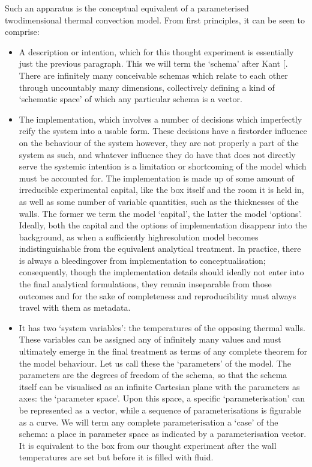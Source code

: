 \documentclass[letterpaper,10pt,english]{jupyterBook}
\begin{document}
\sphinxAtStartPar
Such an apparatus is the conceptual equivalent of a parameterised two\sphinxhyphen{}dimensional thermal convection model. From first principles, it can be seen to comprise:
\begin{itemize}
\item {} 
\sphinxAtStartPar
A description or intention, which for this thought experiment is essentially just the previous paragraph. This we will term the ‘schema’ after Kant {[}\sphinxcite{references:id64}{]}. There are infinitely many conceivable schemas which relate to each other through uncountably many dimensions, collectively defining a kind of ‘schematic space’ of which any particular schema is a vector.

\item {} 
\sphinxAtStartPar
The implementation, which involves a number of decisions which imperfectly reify the system into a usable form. These decisions have a first\sphinxhyphen{}order influence on the behaviour of the system \sphinxhyphen{} however, they are not properly a part of the system as such, and whatever influence they do have that does not directly serve the systemic intention is a limitation or shortcoming of the model which must be accounted for. The implementation is made up of some amount of irreducible experimental capital, like the box itself and the room it is held in, as well as some number of variable quantities, such as the thicknesses of the walls. The former we term the model ‘capital’, the latter the model ‘options’. Ideally, both the capital and the options of implementation disappear into the background, as when a sufficiently high\sphinxhyphen{}resolution model becomes indistinguishable from the equivalent analytical treatment. In practice, there is always a bleeding\sphinxhyphen{}over from implementation to conceptualisation; consequently, though the implementation details should ideally not enter into the final analytical formulations, they remain inseparable from those outcomes and \sphinxhyphen{} for the sake of completeness and reproducibility \sphinxhyphen{} must always travel with them as metadata.

\item {} 
\sphinxAtStartPar
It has two ‘system variables’: the temperatures of the opposing thermal walls. These variables can be assigned any of infinitely many values and must ultimately emerge in the final treatment as terms of any complete theorem for the model behaviour. Let us call these the ‘parameters’ of the model. The parameters are the degrees of freedom of the schema, so that the schema itself can be visualised as an infinite Cartesian plane with the parameters as axes: the ‘parameter space’. Upon this space, a specific ‘parameterisation’ can be represented as a vector, while a sequence of parameterisations is figurable as a curve. We will term any complete parameterisation a ‘case’ of the schema: a place in parameter space as indicated by a parameterisation vector. It is equivalent to the box from our thought experiment after the wall temperatures are set but before it is filled with fluid.


\end{itemize}
\end{document}
